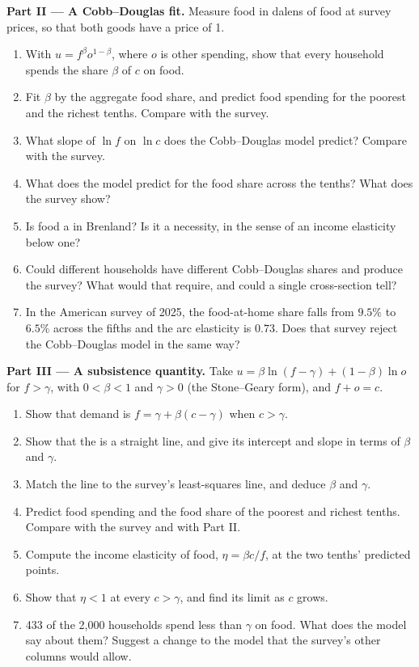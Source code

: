 \begin{problem}
\medskip\noindent\textbf{Part II --- A Cobb--Douglas fit.} Measure food in
dalens of food at survey prices, so that both goods have a price of 1.
\begin{enumerate}[resume]
  \item With $u = f^{\beta}o^{1-\beta}$, where $o$ is other spending, show that every household spends the share $\beta$ of $c$ on food.
  \item Fit $\beta$ by the aggregate food share, and predict food spending for the poorest and the richest tenths. Compare with the survey.
  \item What slope of $\ln f$ on $\ln c$ does the Cobb--Douglas model predict? Compare with the survey.
  \item What does the model predict for the food share across the tenths? What does the survey show?
  \item Is food a  in Brenland? Is it a necessity, in the sense of an income elasticity below one?
  \item Could different households have different Cobb--Douglas shares and produce the survey? What would that require, and could a single cross-section tell?
  \item In the American survey of 2025, the food-at-home share falls from $9.5\%$ to $6.5\%$ across the fifths and the arc elasticity is $0.73$. Does that survey reject the Cobb--Douglas model in the same way? %
\end{enumerate}

\medskip\noindent\textbf{Part III --- A subsistence quantity.} Take
$u = \beta\ln(f - \gamma) + (1 - \beta)\ln o$ for $f > \gamma$, with $0 < \beta < 1$ and
$\gamma > 0$ (the Stone--Geary form), and $f + o = c$.
\begin{enumerate}[resume]
  \item Show that demand is $f = \gamma + \beta(c - \gamma)$ when $c > \gamma$.
  \item Show that the  is a straight line, and give its intercept and slope in terms of $\beta$ and $\gamma$.
  \item Match the line to the survey's least-squares line, and deduce $\beta$ and $\gamma$.
  \item Predict food spending and the food share of the poorest and richest tenths. Compare with the survey and with Part II.
  \item Compute the income elasticity of food, $\eta = \beta c/f$, at the two tenths' predicted points.
  \item Show that $\eta < 1$ at every $c > \gamma$, and find its limit as $c$ grows.
  \item 433 of the 2,000 households spend less than $\gamma$ on food. What does the model say about them? Suggest a change to the model that the survey's other columns would allow. %
\end{enumerate}


\end{problem}

